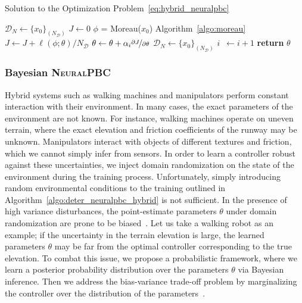 \begin{algorithm}
    \caption{Solution to the Optimization Problem~\eqref{eq:hybrid_neuralpbc}}
    \label{algo:deter_neuralpbc_hybrid}
    \small
    \begin{algorithmic}[1]
        \algrenewcommand\algorithmicindent{0em} %
        \State $\mathcal{D}_N \gets \{x_0\}_{(N_{\mathcal{D}})}$   
        \algrenewcommand\algorithmicindent{1.1em} %
        \State $J \gets 0$
            \State $\phi$ = Moreau($x_0$) \Comment Algorithm~\eqref{algo:moreau}
            \State $J \gets J + \ell(\phi; \theta)/N_{\mathcal{D}}$ 
        \EndFor
        \State $\theta \gets \theta + \alpha_i \nicefrac{\partial J}{\partial \theta}$
        \State $\mathcal{D}_N \gets \{x_0\}_{(N_{\mathcal{D}})}$
        \State $i \;\:\gets i + 1$
        \EndWhile
        \State \textbf{return} $\theta$
    \end{algorithmic}
\end{algorithm}

\subsubsection{Bayesian \textsc{NeuralPBC}}
\label{sssec:bayesian_inference}

Hybrid systems such as walking machines and manipulators perform constant
interaction with their environment. In many cases, the exact parameters of the
environment are not known. For instance, walking machines operate on uneven
terrain, where the exact elevation and friction coefficients of the runway may
be unknown. Manipulators interact with objects of different textures and
friction, which we cannot simply infer from sensors. 
%
In order to learn a controller robust against these uncertainties, we inject
domain randomization on the state of the environment during the training
process.
%
Unfortunately, simply introducing random environmental conditions to the
training outlined in Algorithm~\ref{algo:deter_neuralpbc_hybrid} is not sufficient. 
%
In the presence of high variance disturbances, the point-estimate parameters
$\theta$ under domain randomization are prone to be
biased~\cite{ashenafi2022robustness}.
%
Let us take a walking robot as an example; if the uncertainty in the terrain
elevation is large, the learned parameters $\theta$ may be far from the optimal
controller corresponding to the true elevation.
%
To combat this issue, we propose a probabilistic framework, where we learn a
posterior probability distribution over the parameters $\theta$ via Bayesian
inference. 
%
Then we address the bias-variance trade-off problem by marginalizing the
controller over the distribution of the parameters~\cite{bishop2006pattern}.

